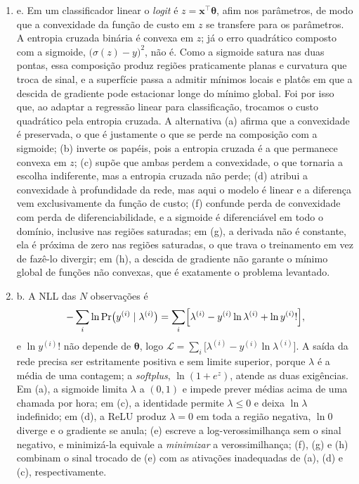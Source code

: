 \documentclass{dlproblemset}
\begin{document}
\begin{enumerate}[1)]
    \item e. Em um classificador linear o \textit{logit} é $z = \mathbf{x}^{\top}\boldsymbol{\theta}$, afim nos parâmetros, de modo que a convexidade da função de custo em $z$ se transfere para os parâmetros. A entropia cruzada binária é convexa em $z$; já o erro quadrático composto com a sigmoide, $\bigl(\sigma(z) - y\bigr)^2$, não é. Como a sigmoide satura nas duas pontas, essa composição produz regiões praticamente planas e curvatura que troca de sinal, e a superfície passa a admitir mínimos locais e platôs em que a descida de gradiente pode estacionar longe do mínimo global. Foi por isso que, ao adaptar a regressão linear para classificação, trocamos o custo quadrático pela entropia cruzada. A alternativa (a) afirma que a convexidade é preservada, o que é justamente o que se perde na composição com a sigmoide; (b) inverte os papéis, pois a entropia cruzada é a que permanece convexa em $z$; (c) supõe que ambas perdem a convexidade, o que tornaria a escolha indiferente, mas a entropia cruzada não perde; (d) atribui a convexidade à profundidade da rede, mas aqui o modelo é linear e a diferença vem exclusivamente da função de custo; (f) confunde perda de convexidade com perda de diferenciabilidade, e a sigmoide é diferenciável em todo o domínio, inclusive nas regiões saturadas; em (g), a derivada não é constante, ela é próxima de zero nas regiões saturadas, o que trava o treinamento em vez de fazê-lo divergir; em (h), a descida de gradiente não garante o mínimo global de funções não convexas, que é exatamente o problema levantado.

    \item b. A NLL das $N$ observações é
    \[
    -\sum_{i}\ln\Pr\bigl(y^{(i)} \mid \lambda^{(i)}\bigr) = \sum_{i}\Bigl[\lambda^{(i)} - y^{(i)}\ln\lambda^{(i)} + \ln y^{(i)}!\Bigr],
    \]
    e $\ln y^{(i)}!$ não depende de $\boldsymbol{\theta}$, logo $\mathcal{L} = \sum_i\bigl[\lambda^{(i)} - y^{(i)}\ln\lambda^{(i)}\bigr]$. A saída da rede precisa ser estritamente positiva e sem limite superior, porque $\lambda$ é a média de uma contagem; a \textit{softplus}, $\ln(1 + e^{z})$, atende as duas exigências. Em (a), a sigmoide limita $\lambda$ a $(0, 1)$ e impede prever médias acima de uma chamada por hora; em (c), a identidade permite $\lambda \leq 0$ e deixa $\ln\lambda$ indefinido; em (d), a ReLU produz $\lambda = 0$ em toda a região negativa, $\ln 0$ diverge e o gradiente se anula; (e) escreve a log-verossimilhança sem o sinal negativo, e minimizá-la equivale a \emph{minimizar} a verossimilhança; (f), (g) e (h) combinam o sinal trocado de (e) com as ativações inadequadas de (a), (d) e (c), respectivamente.
\end{enumerate}
\end{document}
